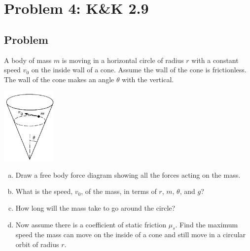 \documentclass[solutions]{esg8012pset}
\begin{document}
\section*{Problem 4: K\&K 2.9}
\subsection*{Problem}
  A body of mass $m$ is moving in a horizontal circle of radius $r$ with a constant speed $v_0$ on the inside wall of a cone. Assume the wall of the cone is frictionless. The wall of the cone makes an angle $\theta$ with the vertical.
  \begin{center}\includegraphics[width=0.2\textwidth]{ps02_3}\end{center}
  \begin{enumerate}[a)]
    \item Draw a free body force diagram showing all the forces acting on the mass.
    \item What is the speed, $v_0$, of the mass, in terms of $r$, $m$, $\theta$, and $g$?
    \item How long will the mass take to go around the circle?
    \item Now assume there is a coefficient of static friction $\mu_s$. Find the maximum speed the mass can move on the inside of a cone and still move in a circular orbit of radius $r$.
  \end{enumerate}
\end{document}
